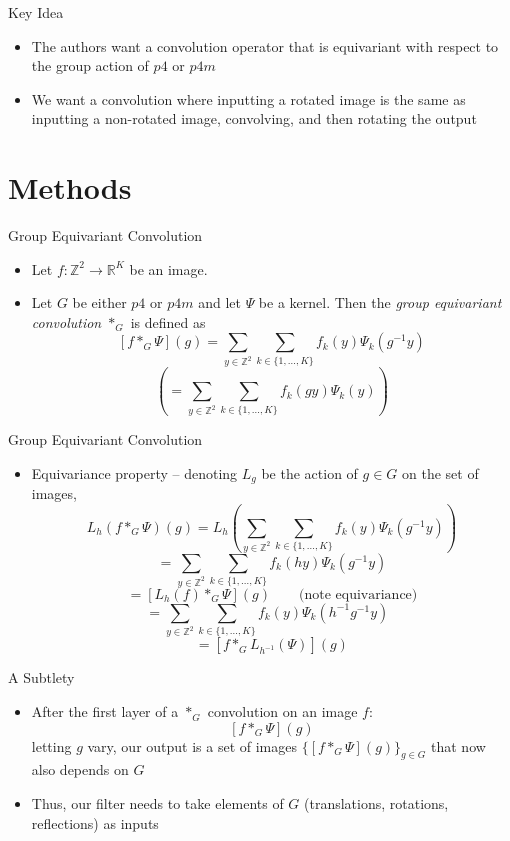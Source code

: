 \documentclass{beamer}
\newcommand{\R}{\mathbb{R}}
\newcommand{\Z}{\mathbb{Z}}
\begin{document}
\begin{frame}{Key Idea}
    \begin{itemize}
        \item The authors want a convolution operator that is equivariant with respect to the group action of $p4$ or $p4m$
        \item We want a convolution where inputting a rotated image is the same as inputting a non-rotated image, convolving, and then rotating the output
    \end{itemize}
\end{frame}

\section{Methods}

\begin{frame}{Group Equivariant Convolution}
    \begin{itemize}
        \item Let $f: \Z^2 \to \R^K$ be an image.  
        \item Let $G$ be either $p4$ or $p4m$ and let $\Psi$ be a kernel.  Then the \emph{group equivariant convolution} $*_G$ is defined as 
        $$[f *_G \Psi](g) = \sum_{y \in \Z^2}\sum_{k \in \{1, \dots, K\}} f_k(y)\Psi_k(g^{-1}y)$$
        $$\left(= \sum_{y \in \Z^2}\sum_{k \in \{1, \dots, K\}} f_k(gy)\Psi_k(y)\right)$$
    \end{itemize}
\end{frame}

\begin{frame}{Group Equivariant Convolution}
    \begin{itemize}
        \item Equivariance property -- denoting $L_g$ be the action of $g\in G$ on the set of images, 
        $$L_h(f *_G \Psi)(g) = L_h\left(\sum_{y \in \Z^2}\sum_{k \in \{1, \dots, K\}} f_k(y)\Psi_k(g^{-1}y)\right)$$
        $$= \sum_{y \in \Z^2}\sum_{k \in \{1, \dots, K\}} f_k(hy)\Psi_k(g^{-1}y)$$
        $$ = [L_h(f) *_G \Psi](g) \qquad \text{(note equivariance)}$$
        $$= \sum_{y \in \Z^2}\sum_{k \in \{1, \dots, K\}} f_k(y)\Psi_k(h^{-1}g^{-1}y) \text{ }$$
        $$= [f *_G L_{h^{-1}}(\Psi)](g)$$
    \end{itemize}
\end{frame}

\begin{frame}{A Subtlety}
    \begin{itemize}
        \item After the first layer of a $*_G$ convolution on an image $f$:
         $$[f *_G \Psi](g) $$
         letting $g$ vary, our output is a set of images $\{[f *_G \Psi](g)\}_{g\in G}$ that now also depends on $G$
         \item Thus, our filter needs to take elements of $G$ (translations, rotations, reflections) as inputs
    \end{itemize}
\end{frame}
\end{document}
